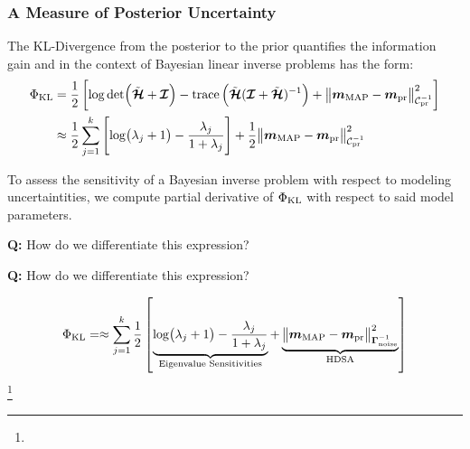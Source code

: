 \documentclass[
  pdf,
  10pt,
  xcolor={svgnames},
]{beamer}
\newcommand\blfootnote[1]{%
  \begingroup
  \renewcommand\thefootnote{}\footnote{\scriptsize #1}%
  \addtocounter{footnote}{-1}%
  \endgroup
}
\newcommand{\mc}[1]{\mathcal{#1}}
\newcommand{\mcb}[1]{\boldsymbol{\mathcal{#1}}}
\renewcommand{\vec}[1]{{\mathchoice
                     {\mbox{\boldmath$\displaystyle{#1}$}}
                     {\mbox{\boldmath$\textstyle{#1}$}}
                     {\mbox{\boldmath$\scriptstyle{#1}$}}
                     {\mbox{\boldmath$\scriptscriptstyle{#1}$}}}}
\newcommand{\mat}[1]{\mathbf{{#1}}}
\begin{document}
\begin{frame}
  \frametitle{A Measure of Posterior Uncertainty}
  \begin{definition}
    The KL-Divergence from the posterior to the prior quantifies the information
    gain and in the context of Bayesian linear inverse problems has the form:
    \begin{align*}
      \Phi_{\rm KL}
       & =
      \frac{1}{2}\left[
      \log\det(\tilde{\mcb{H}} + \mcb{I})
      - {\rm trace}\left(
      \tilde{\mcb{H}}(\mcb{I} + \tilde{\mcb{H}})^{-1}
      \right)
      + \norm{
        \vec{m}_{\rm MAP} - \vec{m}_{\rm pr}
      }_{\mc{C}_{\rm pr}^{-1}}^2
      \right]    \\
       & \approx
      \frac{1}{2}\sum_{j=1}^k
      \left[
        \log(\lambda_j + 1)
        - \frac{\lambda_j}{1+\lambda_j}
        \right]
      + \frac{1}{2}{\norm{
          \vec{m}_{\rm MAP} - \vec{m}_{\rm pr}
        }_{\mc{C}_{\rm pr}^{-1}}^2}
    \end{align*}
  \end{definition}
  \pause
  To assess the sensitivity of a Bayesian inverse problem with respect to
  modeling uncertaintities, we compute partial derivative of $\Phi_{\rm KL}$
  with respect to said model parameters.
  \pause
  \begin{alertblock}{}
    \begin{center}
      {\bf Q:} How do we differentiate this expression?
    \end{center}
  \end{alertblock}
\end{frame}
\begin{frame}
  \begin{alertblock}{}
    \begin{center}
      {\bf Q:} How do we differentiate this expression?
    \end{center}
  \end{alertblock}
  \[
    \Phi_{\rm KL}
    = \approx
    \sum_{j=1}^k
    \frac{1}{2}\left[
      \underbrace{
        \log(\lambda_j + 1)
        - \frac{\lambda_j}{1+\lambda_j}
      }_{\text{Eigenvalue Sensitivities}}
      + \underbrace{
        \norm{
          \vec{m}_{\rm MAP} - \vec{m}_{\rm pr}
        }_{\mat{\Gamma}_{\rm noise}^{-1}}^2
      }_{\text{HDSA}}
      \right]
  \]
  \blfootnote{}
\end{frame}

\end{document}
